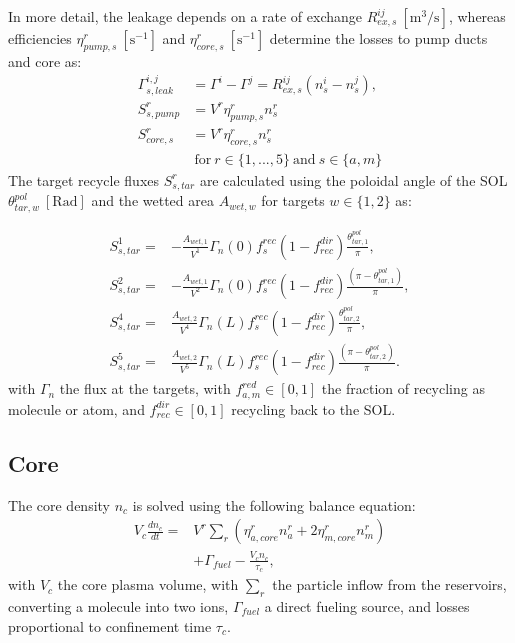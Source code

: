 \documentclass[amsmath,amssymb,a4]{revtex4-2}
\begin{document}
\noindent In more detail, the leakage depends on a rate of exchange $R^{ij}_{ex,s}~\mathrm{[m^3/s]}$, whereas efficiencies $\eta^r_{pump,s}~\mathrm{[s^{-1}]}$ and $\eta^r_{core,s}~\mathrm{[s^{-1}]}$ determine the losses to pump ducts and core as:
\begin{equation}
\begin{aligned}
   \Gamma^{i,j}_{s,leak} &= \Gamma^i - \Gamma^j = R^{ij}_{ex,s}(n_s^i-n_s^j), \\
     S_{s,pump}^r & = V^r\eta_{pump,s}^r n_s^r  \\  
    S_{core,s}^r & = V^r\eta_{core,s}^r n_s^r  \\
     & ~\text{for} ~r \in \{ 1, ...,5 \} ~\text{and}~ s \in \{a,m\} 
   \label{eq: neutral sources}
\end{aligned}
\end{equation}
\noindent The target recycle fluxes $S^r_{s,tar}$ are calculated using the poloidal angle of the SOL $\theta^{pol}_{tar,w}~\mathrm{[Rad]}$ and the wetted area $A_{wet,w}$ for targets $w \in \{1,2\}$ as:

\begin{equation}
\begin{aligned}
    S^1_{s,tar} =& -\frac{A_{wet,1}}{V^1}\Gamma_n(0)f^{rec}_{s}(1-f^{dir}_{rec})\frac{\theta^{pol}_{tar,1}}{\pi}, \\
    S^2_{s,tar} =& -\frac{A_{wet,1}}{V^2}\Gamma_n(0)f^{rec}_{s}(1-f^{dir}_{rec})\frac{(\pi -\theta^{pol}_{tar,1})}{\pi}, \\
    S^4_{s,tar} =& \frac{A_{wet,2}}{V^4}\Gamma_n(L)f^{rec}_{s}(1-f^{dir}_{rec})\frac{\theta^{pol}_{tar,2}}{\pi}, \\
    S^5_{s,tar} =& \frac{A_{wet,2}}{V^5}\Gamma_n(L)f^{rec}_{s}(1-f^{dir}_{rec})\frac{(\pi -\theta^{pol}_{tar,2})}{\pi}.
    \end{aligned}
\end{equation}
with $\Gamma_n$ the flux at the targets, with $ f^{red}_{a,m} \in [0,1]$ the fraction of recycling as molecule or atom, and $f^{dir}_{rec}\in [0,1]$  recycling back to the SOL. %

\subsection{Core}
The core density $n_{c}$ is solved using the following balance equation:
\begin{equation}
\begin{aligned}
    V_c\frac{dn_{c}}{dt} =& V^r \sum_r (\eta^r_{a,core}n^r_{a} + 2\eta^r_{m,core}n^r_{m})\\
    &+\Gamma_{fuel}-\frac{V_c n_c}{\tau_c}, 
\end{aligned}
    \label{eq:core bal}
\end{equation}
with $V_c$ the core plasma volume, with $\sum_r$ the particle inflow from the reservoirs, converting a molecule into two ions, $\Gamma_{fuel}$ a direct fueling source, and losses proportional to confinement time $\tau_c$.
\end{document}
